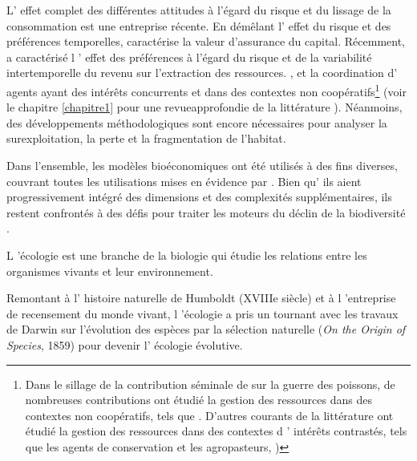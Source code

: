 \begin{displayquote}
\begin{displayquote}
\begin{displayquote}
{{{{L' effet complet des différentes attitudes à l'égard du risque et du lissage de la consommation est une entreprise récente. En démêlant l' effet du risque et des préférences temporelles, \cite{quaas_2019_insurance, AugeraudVeron2019} caractérise la valeur d'assurance du capital. Récemment, \cite{KELSALL2023102855} a caractérisé l ' effet des préférences à l'égard du risque et de la variabilité intertemporelle du revenu sur l'extraction des ressources. }, et la coordination d' agents ayant des intérêts concurrents et dans des contextes non coopératifs\footnote{Dans le sillage de la contribution séminale de \cite{levhari_great_1980} sur la guerre des poissons, de nombreuses contributions ont étudié la gestion des ressources dans des contextes non coopératifs, tels que \cite{janmaat_sharing_2005, kaffine_unitization_2010, costello_partial_2015, costello_private_2017}. D'autres courants de la littérature ont étudié la gestion des ressources dans des contextes d ' intérêts contrastés, tels que les agents de conservation et les agropasteurs, \cite{Skonhoft1998})} (voir le chapitre \ref{chapitre1} pour une revueapprofondie de la littérature ). Néanmoins, des développements méthodologiques sont encore nécessaires pour analyser la surexploitation, la perte et la fragmentation de l'habitat.



Dans l'ensemble, les modèles bioéconomiques ont été utilisés à des fins diverses, couvrant toutes les utilisations mises en évidence par \cite{varenne_epistemologie_2014} . Bien qu' ils aient progressivement intégré des dimensions et des complexités supplémentaires, ils restent confrontés à des défis pour traiter les moteurs du déclin de la biodiversité \citep{Drechsler20200}.



\clearpage
\begin{tcolorbox}[breakable, 
				  colback=verylightgray, 
				  colframe=gray!75!black, 
				  title= {Box 3 - A brief overview of ecological modeling for biodiversity},
				  fontupper=\small]
\par %
\justifying %
 
L 'écologie est une branche de la biologie qui étudie les relations entre les organismes vivants et leur environnement.



Remontant à l' histoire naturelle de Humboldt (XVIIIe siècle) et à l 'entreprise de recensement du monde vivant, l 'écologie a pris un tournant avec les travaux de Darwin sur l'évolution des espèces par la sélection naturelle (\textit{On the Origin of Species}, 1859) pour devenir l' écologie évolutive. 




\end{tcolorbox}}}}
\end{displayquote}
\end{displayquote}
\end{displayquote}
